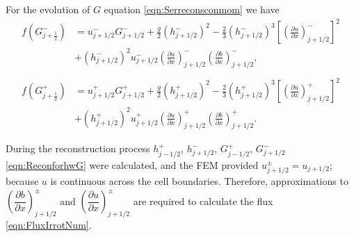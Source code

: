 For the evolution of $G$ equation \eqref{eqn:Serreconsconmom} we have 
\begin{subequations}
\begin{align}
f\left(G^-_{j+\frac{1}{2}}\right) &=  u^-_{j + 1/2} G^-_{j + 1/2}  + \frac{g}{2}\left(h^-_{j + 1/2} \right)^2 - \frac{2}{3}\left(h^-_{j + 1/2}\right)^3 \left[\left(\frac{\partial {u}}{\partial x} \right)^-_{j + 1/2} \right]^2 \nonumber\\ &+ \left(h^-_{j + 1/2}\right)^2 u^-_{j + 1/2} \left(\frac{\partial {u}}{\partial x} \right)^-_{j + 1/2} \left(\frac{\partial b}{\partial x} \right)^-_{j + 1/2}  ,\\ \nonumber \\
f\left(G^+_{j+\frac{1}{2}}\right) &= u^+_{j + 1/2} G^+_{j + 1/2}  + \frac{g}{2}\left(h^+_{j + 1/2} \right)^2 - \frac{2}{3}\left(h^+_{j + 1/2}\right)^3 \left[\left(\frac{\partial {u}}{\partial x} \right)^+_{j + 1/2} \right]^2 \nonumber\\ &+ \left(h^+_{j + 1/2}\right)^2 u^+_{j + 1/2} \left(\frac{\partial {u}}{\partial x} \right)^+_{j + 1/2} \left(\frac{\partial b}{\partial x} \right)^+_{j + 1/2}.
\end{align}
\label{eqn:FluxIrrotNum}
\end{subequations}

During the reconstruction process $h^+_{j - 1/2}$, $h^-_{j + 1/2}$, $G^+_{j - 1/2}$, $G^-_{j + 1/2}$ \eqref{eqn:ReconforhwG} were calculated, and the FEM provided $u^\pm_{j+1/2} = u_{j+1/2}$; because $u$ is continuous across the cell boundaries. Therefore, approximations to $\left(\dfrac{\partial {b}}{\partial x} \right)^\pm_{j + 1/2}$ and $\left(\dfrac{\partial {u}}{\partial x} \right)^\pm_{j + 1/2}$ are required to calculate the flux \eqref{eqn:FluxIrrotNum}. 

